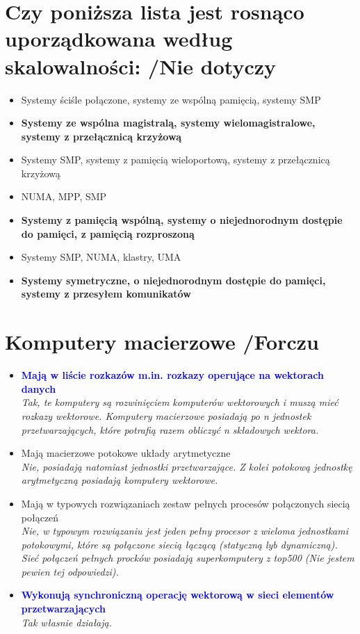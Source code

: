 \documentclass[a4paper,twoside]{article}
\begin{document}
\section{Czy poniższa lista jest rosnąco uporządkowana według skalowalności: {\small /Nie dotyczy}}
	\begin{itemize}
    \item Systemy ściśle połączone, systemy ze wspólną pamięcią, systemy SMP
    \item \textbf{Systemy ze wspólna magistralą, systemy wielomagistralowe, systemy z przełącznicą krzyżową}
    \item Systemy SMP, systemy z pamięcią wieloportową, systemy z przełącznicą krzyżową
    \item NUMA, MPP, SMP
    \item \textbf{Systemy z pamięcią wspólną, systemy o niejednorodnym dostępie do pamięci, z pamięcią rozproszoną}
    \item Systemy SMP, NUMA, klastry, UMA
    \item \textbf{Systemy symetryczne, o niejednorodnym dostępie do pamięci, systemy z przesyłem komunikatów}
    \end{itemize}
    
\section{Komputery macierzowe {\small /Forczu}}
	\begin{itemize}
    \item \textcolor{Blue}{\textbf{Mają w liście rozkazów m.in. rozkazy operujące na wektorach danych}}\\
    {\small \emph{Tak, te komputery są rozwinięciem komputerów wektorowych i muszą mieć rozkazy wektorowe. Komputery macierzowe posiadają po \emph{n} jednostek przetwarzających, które potrafią razem obliczyć \emph{n} składowych wektora.}}
    \item Mają macierzowe potokowe układy arytmetyczne\\
    {\small \emph{Nie, posiadają natomiast jednostki przetwarzające. Z kolei potokową jednostkę arytmetyczną posiadają komputery wektorowe.}}
    \item Mają w typowych rozwiązaniach zestaw pełnych procesów połączonych siecią połączeń\\
    {\small \emph{Nie, w typowym rozwiązaniu jest jeden pełny procesor z wieloma jednostkami potokowymi, które są połączone siecią łączącą (statyczną lyb dynamiczną). Sieć połączeń pełnych procków posiadają superkomputery z top500 (Nie jestem pewien tej odpowiedzi).}}
    \item \textcolor{Blue}{\textbf{Wykonują synchroniczną operację wektorową w sieci elementów przetwarzających}}\\
    {\small \emph{Tak własnie działają.}}
    \end{itemize}
    
\end{document}
